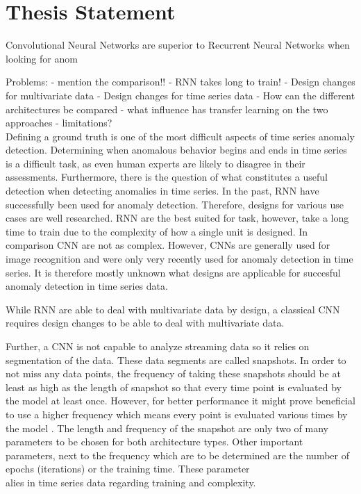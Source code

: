 \section{Thesis Statement}

Convolutional Neural Networks are superior to Recurrent Neural Networks when looking for anom

Problems:
- mention the comparison!!
 - RNN takes long to train!
 - Design changes for multivariate data
 - Design changes for time series data
 - How can the different architectures be compared
 - what influence has transfer learning on the two approaches
 - limitations?\\

Defining a ground truth is one of the most difficult aspects of time series anomaly detection. Determining when anomalous behavior begins and ends in time series is a difficult task, as even human experts are likely to disagree in their assessments. Furthermore, there is the question of what constitutes a useful detection when detecting anomalies in time series.
In the past, RNN have successfully been used for anomaly detection. Therefore, designs for various use cases are well researched. RNN are the best suited for task, however, take a long time to train due to the complexity of how a single unit is designed. In comparison CNN are not as complex. However, CNNs are generally used for image recognition and were only very recently used for anomaly detection in time series. It is therefore mostly unknown what designs are applicable for succesful anomaly detection in time series data. 

While RNN are able to deal with multivariate data by design, a classical CNN requires design changes to be able to deal with multivariate data. 

Further, a CNN is not capable to analyze streaming data so it relies on segmentation of the data. These data segments are called snapshots. In order to not miss any data points, the frequency of taking these snapshots should be at least as high as the length of snapshot so that every time point is evaluated by the model at least once. However, for better performance it might prove beneficial to use a higher frequency which means every point is evaluated various times by the model \parencite{wen2019time}. The length and frequency of the snapshot are only two of many parameters to be chosen for both architecture types. Other important parameters, next to the frequency which are to be determined are the number of epochs (iterations) or the training time. These parameter 
\\alies in time series data regarding training and complexity.


